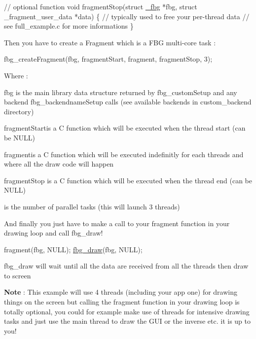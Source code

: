 \begin{DoxyCode}
\textcolor{comment}{// optional function}
\textcolor{keywordtype}{void} fragmentStop(\textcolor{keyword}{struct} \hyperlink{struct__fbg}{\_fbg} *fbg, \textcolor{keyword}{struct} \_fragment\_user\_data *data) \{
    \textcolor{comment}{// typically used to free your per-thread data}
    \textcolor{comment}{// see full\_example.c for more informations}
\}
\end{DoxyCode}


Then you have to create a \textquotesingle{}Fragment\textquotesingle{} which is a F\+BG multi-\/core task \+:


\begin{DoxyCode}
fbg\_createFragment(fbg, fragmentStart, fragment, fragmentStop, 3);
\end{DoxyCode}


Where \+:


\begin{DoxyItemize}
\item {\ttfamily fbg} is the main library data structure returned by {\ttfamily fbg\+\_\+custom\+Setup} and any backend {\ttfamily fbg\+\_\+backendname\+Setup} calls (see available backends in {\ttfamily custom\+\_\+backend} directory)
\item {\ttfamily fragment\+Start}is a C function which will be executed when the thread start (can be N\+U\+LL)
\item {\ttfamily fragment}is a C function which will be executed indefinitly for each threads and where all the draw code will happen
\item {\ttfamily fragment\+Stop} is a C function which will be executed when the thread end (can be N\+U\+LL)
\item {}is the number of parallel tasks (this will launch 3 threads)
\end{DoxyItemize}

And finally you just have to make a call to your fragment function in your drawing loop and call {\ttfamily fbg\+\_\+draw}!


\begin{DoxyCode}
fragment(fbg, NULL);
\hyperlink{fbgraphics_8h_a2dfb2f17bc31e161868e6baf1c391816}{fbg\_draw}(fbg, NULL);
\end{DoxyCode}


{\ttfamily fbg\+\_\+draw} will wait until all the data are received from all the threads then draw to screen

{\bfseries Note} \+: This example will use 4 threads (including your app one) for drawing things on the screen but calling the fragment function in your drawing loop is totally optional, you could for example make use of threads for intensive drawing tasks and just use the main thread to draw the G\+UI or the inverse etc. it is up to you!


